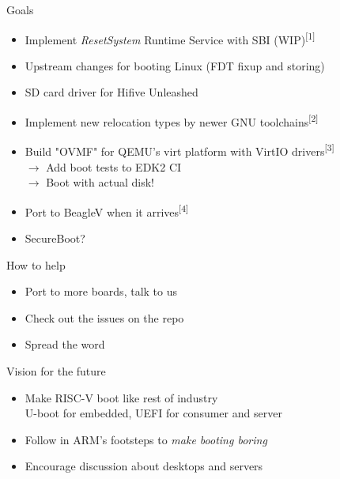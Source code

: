 \documentclass[
  10pt
]{beamer}
\begin{document}
\begin{frame}{Goals}
  \begin{itemize}
    \item Implement \textit{ResetSystem} Runtime Service with SBI (WIP)\textsuperscript{\tiny [1]}
    \item Upstream changes for booting Linux (FDT fixup and storing)
    \item SD card driver for Hifive Unleashed
    \item Implement new relocation types by newer GNU toolchains\textsuperscript{\tiny [2]}
    \item Build "OVMF" for QEMU's virt platform with VirtIO drivers\textsuperscript{\tiny [3]} \\
          $\rightarrow$ Add boot tests to EDK2 CI \\
          $\rightarrow$ Boot with actual disk! \\
    \item Port to BeagleV when it arrives\textsuperscript{\tiny [4]}
    \item SecureBoot?
  \end{itemize}
\end{frame}

\begin{frame}{How to help}
  \begin{itemize}
    \item Port to more boards, talk to us
    \item Check out the issues on the repo
    \item Spread the word
  \end{itemize}
\end{frame}

\begin{frame}{Vision for the future}
  \begin{itemize}
    \item Make RISC-V boot like rest of industry \\
          U-boot for embedded, UEFI for consumer and server
    \item Follow in ARM's footsteps to \textit{make booting boring}
    \item Encourage discussion about desktops and servers
  \end{itemize}
\end{frame}
\end{document}
